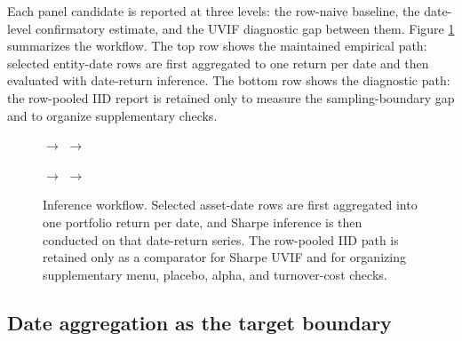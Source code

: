\documentclass[12pt,a4paper]{article}
\begin{document}
Each panel candidate is reported at three levels: the row-naive
baseline, the date-level confirmatory estimate, and the UVIF diagnostic
gap between them.
Figure \ref{fig:workflow} summarizes the workflow.  The top row shows
the maintained empirical path: selected entity-date rows are first
aggregated to one return per date and then evaluated with date-return
inference.  The bottom row shows the diagnostic path: the row-pooled IID
report is retained only to measure the sampling-boundary gap and to
organize supplementary checks.

\begin{figure}[!htbp]
\centering
\small
\setlength{\fboxsep}{6pt}
\quad
\(\rightarrow\)\quad
{}\quad
\(\rightarrow\)\quad
{}

\vspace{0.6em}

\quad
\(\rightarrow\)\quad
{}\quad
\(\rightarrow\)\quad
{}
\caption{Inference workflow. Selected asset-date rows are first
aggregated into one portfolio return per date, and Sharpe inference is
then conducted on that date-return series. The row-pooled IID path is
retained only as a comparator for Sharpe UVIF and for organizing
supplementary menu, placebo, alpha, and turnover-cost checks.}
\label{fig:workflow}
\end{figure}

\subsection{Date aggregation as the target boundary}
\end{document}
